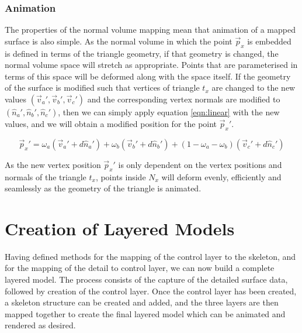 \subsubsection{\label{sec:scandata:pointtosurface:reconstruction:animation}Animation}

The properties of the normal volume mapping mean that animation of a mapped surface is also simple. As the normal volume in which the point $\vec{p}_x$ is embedded is defined in terms of the triangle geometry, if that geometry is changed, the normal volume space will stretch as appropriate. Points that are parameterised in terms of this space will be deformed along with the space itself. If the geometry of the surface is modified such that vertices of triangle $t_x$ are changed to the new values $(\vec{v}_a', \vec{v}_b', \vec{v}_c')$ and the corresponding vertex normals are modified to $(\hat{n}_a', \hat{n}_b', \hat{n}_c')$, then we can simply apply equation \ref{eqn:linear} with the new values, and we will obtain a modified position for the point $\vec{p}_x'$.

\begin{equation} \label{eqn:rebuilddetail}
\vec{p}_x' = \omega_a(\vec{v}_a' + d\hat{n}_a') + \omega_b(\vec{v}_b' + d\hat{n}_b') + (1-\omega_a-\omega_b)(\vec{v}_c' + d\hat{n}_c')
\end{equation}

As the new vertex position $\vec{p}_x'$ is only dependent on the vertex positions and normals of the triangle $t_x$, points inside $N_x$ will deform evenly, efficiently and seamlessly as the geometry of the triangle is animated.

\section{\label{sec:scandata:creation}Creation of Layered Models}

Having defined methods for the mapping of the control layer to the skeleton, and for the mapping of the detail to control layer, we can now build a complete layered model. The process consists of the capture of the detailed surface data, followed by creation of the control layer. Once the control layer has been created, a skeleton structure can be created and added, and the three layers are then mapped together to create the final layered model which can be animated and rendered as desired.

